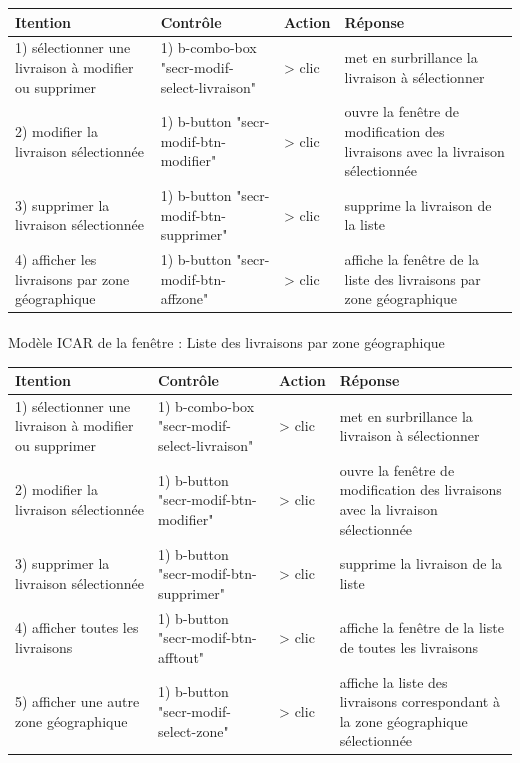 \documentclass{report}
\begin{document}
\begin{longtable}{|p{3cm}|p{4cm}|p{2cm}|p{5cm}|}
\hline
Itention&Contrôle&Action&Réponse\\\hline
1) sélectionner une livraison à modifier ou supprimer&1) b-combo-box \newline
"secr-modif-select-livraison"&> clic&met en surbrillance la livraison à sélectionner\\\hline
2) modifier la livraison sélectionnée&1) b-button\newline
"secr-modif-btn-modifier"&> clic&ouvre la fenêtre de modification des livraisons avec la livraison sélectionnée\\\hline
3) supprimer la livraison sélectionnée&1) b-button\newline
"secr-modif-btn-supprimer"&> clic&supprime la livraison de la liste\\\hline
4) afficher les livraisons par zone géographique&1) b-button\newline
"secr-modif-btn-affzone"&> clic&affiche la fenêtre de la liste des livraisons par zone géographique\\\hline
\end{longtable}

\paragraph{}
Modèle ICAR de la fenêtre : Liste des livraisons par zone géographique

\begin{longtable}{|p{3cm}|p{4cm}|p{2cm}|p{5cm}|}
\hline
Itention&Contrôle&Action&Réponse\\\hline
1) sélectionner une livraison à modifier ou supprimer&1) b-combo-box \newline
"secr-modif-select-livraison"&> clic&met en surbrillance la livraison à sélectionner\\\hline
2) modifier la livraison sélectionnée&1) b-button\newline
"secr-modif-btn-modifier"&> clic&ouvre la fenêtre de modification des livraisons avec la livraison sélectionnée\\\hline
3) supprimer la livraison sélectionnée&1) b-button\newline
"secr-modif-btn-supprimer"&> clic&supprime la livraison de la liste\\\hline
4) afficher toutes les livraisons&1) b-button\newline
"secr-modif-btn-afftout"&> clic&affiche la fenêtre de la liste de toutes les livraisons\\\hline
5) afficher une autre zone géographique&1) b-button\newline
"secr-modif-select-zone"&> clic&affiche la liste des livraisons correspondant à la zone géographique sélectionnée\\\hline
\end{longtable}
\end{document}
